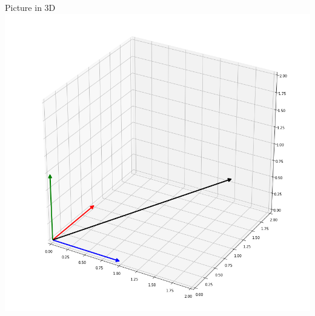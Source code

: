 \documentclass{beamer}
\begin{document}
\begin{frame}{Picture in 3D}
  \hspace{-2cm}
  \includegraphics[trim={0 0cm 5cm 13.5cm},clip,scale=0.5]{3dvector.png}
\end{frame}
\end{document}
